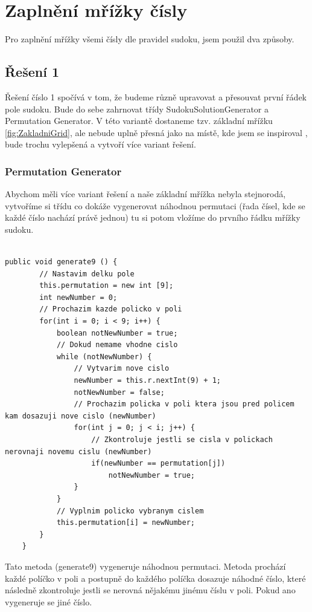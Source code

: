 \chapter{Zaplnění mřížky čísly}
Pro zaplnění mřížky všemi čísly dle pravidel sudoku, jsem použil dva způsoby.

\section{Řešení 1}
Řešení číslo 1 spočívá v tom, že budeme různě upravovat a přesouvat první řádek pole sudoku. Bude do sebe zahrnovat třídy SudokuSolutionGenerator a Permutation Generator. V této variantě dostaneme tzv. základní mřížku \ref{fig:ZakladniGrid}, ale nebude uplně přesná jako na místě, kde jsem se inspiroval \cite{Reseni1-1} \cite{Reseni1-2}, bude trochu vylepšená a vytvoří více variant řešení.

\label{PermutationGenerator}\subsection{Permutation Generator}
Abychom měli více variant řešení a naše základní mřížka nebyla stejnorodá, vytvoříme si třídu co dokáže vygenerovat náhodnou permutaci (řada čísel, kde se každé číslo nachází právě jednou) tu si potom vložíme do prvního řádku mřížky sudoku.\\
\\
\begin{lstlisting}
public void generate9 () {
        // Nastavim delku pole
        this.permutation = new int [9];
        int newNumber = 0;
        // Prochazim kazde policko v poli
        for(int i = 0; i < 9; i++) {
            boolean notNewNumber = true;
            // Dokud nemame vhodne cislo
            while (notNewNumber) {
                // Vytvarim nove cislo
                newNumber = this.r.nextInt(9) + 1;
                notNewNumber = false;
                // Prochazim policka v poli ktera jsou pred policem kam dosazuji nove cislo (newNumber)
                for(int j = 0; j < i; j++) {
                    // Zkontroluje jestli se cisla v polickach nerovnaji novemu cislu (newNumber)
                    if(newNumber == permutation[j])
                        notNewNumber = true;
                }
            }
            // Vyplnim policko vybranym cislem
            this.permutation[i] = newNumber;
        }
    }
\end{lstlisting}

Tato metoda (generate9) vygeneruje náhodnou permutaci. Metoda prochází každé políčko v poli a postupně do každého políčka dosazuje náhodné číslo, které následně zkontroluje jestli se nerovná nějakému jinému číslu v poli. Pokud ano vygeneruje se jiné číslo. 

